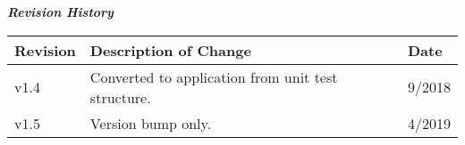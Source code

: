 \iffalse
This file is protected by Copyright. Please refer to the COPYRIGHT file
distributed with this source distribution.

This file is part of OpenCPI <http://www.opencpi.org>

OpenCPI is free software: you can redistribute it and/or modify it under the
terms of the GNU Lesser General Public License as published by the Free Software
Foundation, either version 3 of the License, or (at your option) any later
version.

OpenCPI is distributed in the hope that it will be useful, but WITHOUT ANY
WARRANTY; without even the implied warranty of MERCHANTABILITY or FITNESS FOR A
PARTICULAR PURPOSE. See the GNU Lesser General Public License for more details.

You should have received a copy of the GNU Lesser General Public License along
with this program. If not, see <http://www.gnu.org/licenses/>.
\fi

\def\docTitle{HSMC Debug Header Breakout Stratix IV (alst4) Test App Guide}
\def\snippetpath{../../../../../doc/av/tex/snippets}



\maketitle
\thispagestyle{empty}
\newpage

\begin{center}
  \textit{\textbf{Revision History}}
  \begin{longtable}{|p{}
                    |p{}
                    |p{}|}
    \hline
    \rowcolor{blue}
    \textbf{Revision} & \textbf{Description of Change} & \textbf{Date} \\
    \hline
    v1.4 & Converted to application from unit test structure. & 9/2018 \\
    \hline
    v1.5 & Version bump only. & 4/2019 \\
    \hline
  \end{longtable}
\end{center}
\newpage

